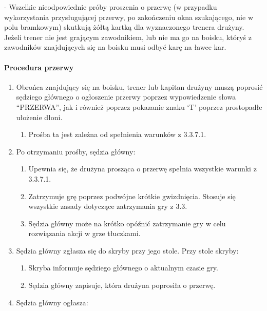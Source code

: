 \documentclass[12pt]{article}
\newcommand\yellowcard{\bgroup\color{yellow}\markoverwith{\textcolor{yellow}{\rule[-0.5ex]{2pt}{0.4pt}}}\ULon}
\begin{document}
\yellowcard{Żółta kartka} - Wszelkie nieodpowiednie próby proszenia o przerwę
(w przypadku wykorzystania przysługującej przerwy, po zakończeniu okna
szukającego, nie w polu bramkowym) skutkują żółtą kartką dla
wyznaczonego trenera drużyny. Jeżeli trener nie jest grającym
zawodnikiem, lub nie ma go na boisku, któryś z zawodników znajdujących
się na boisku musi odbyć karę na ławce kar.

\paragraph{Procedura przerwy}

\begin{enumerate}
	\item
	      Obrońca znajdujący się na boisku, trener lub kapitan drużyny muszą
	      poprosić sędziego głównego o ogłoszenie przerwy poprzez wypowiedzenie
	      słowa ``PRZERWA'', jak i również poprzez pokazanie znaku `T' poprzez
	      prostopadłe ułożenie dłoni.

	      \begin{enumerate}
		      \item
		            Prośba ta jest zależna od spełnienia warunków z 3.3.7.1.
	      \end{enumerate}
	\item
	      Po otrzymaniu prośby, sędzia główny:

	      \begin{enumerate}
		      \item
		            Upewnia się, że drużyna prosząca o przerwę spełnia wszystkie warunki
		            z 3.3.7.1.
		      \item
		            Zatrzymuje grę poprzez podwójne krótkie gwizdnięcia. Stosuje się
		            wszystkie zasady dotyczące zatrzymania gry z 3.3.
		      \item
		            Sędzia główny może na krótko opóźnić zatrzymanie gry w celu
		            rozwiązania akcji w grze tłuczkami.
	      \end{enumerate}
	\item
	      Sędzia główny zgłasza się do skryby przy jego stole. Przy stole
	      skryby:

	      \begin{enumerate}
		      \item
		            Skryba informuje sędziego głównego o aktualnym czasie gry.
		      \item
		            Sędzia główny zapisuje, która drużyna poprosiła o przerwę.
	      \end{enumerate}
	\item
	      Sędzia główny ogłasza:


\end{enumerate}
\end{document}

